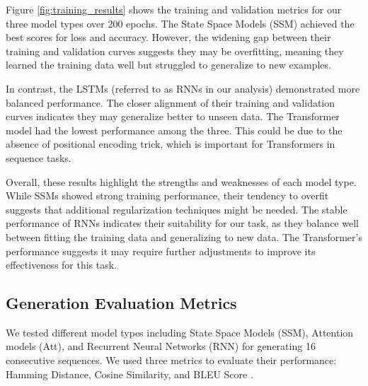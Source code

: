 \documentclass[10pt,a4paper]{article}
\begin{document}
Figure \ref{fig:training_results} shows the training and validation metrics for our three model types over 200 epochs. The State Space Models (SSM) achieved the best scores for loss and accuracy. However, the widening gap between their training and validation curves suggests they may be overfitting, meaning they learned the training data well but struggled to generalize to new examples.

In contrast, the LSTMs (referred to as RNNs in our analysis) demonstrated more balanced performance. The closer alignment of their training and validation curves indicates they may generalize better to unseen data. The Transformer model had the lowest performance among the three. This could be due to the absence of positional encoding trick, which is important for Transformers in sequence tasks.

Overall, these results highlight the strengths and weaknesses of each model type. While SSMs showed strong training performance, their tendency to overfit suggests that additional regularization techniques might be needed. The stable performance of RNNs indicates their suitability for our task, as they balance well between fitting the training data and generalizing to new data. The Transformer's performance suggests it may require further adjustments to improve its effectiveness for this task.

\subsection{Generation Evaluation Metrics}

We tested different model types including State Space Models (SSM), Attention models (Att), and Recurrent Neural Networks (RNN) for generating 16 consecutive sequences. We used three metrics to evaluate their performance: Hamming Distance, Cosine Similarity, and BLEU Score \cite{sutskever2014sequence, hamming1950error, papineni2002bleu}.
\end{document}
